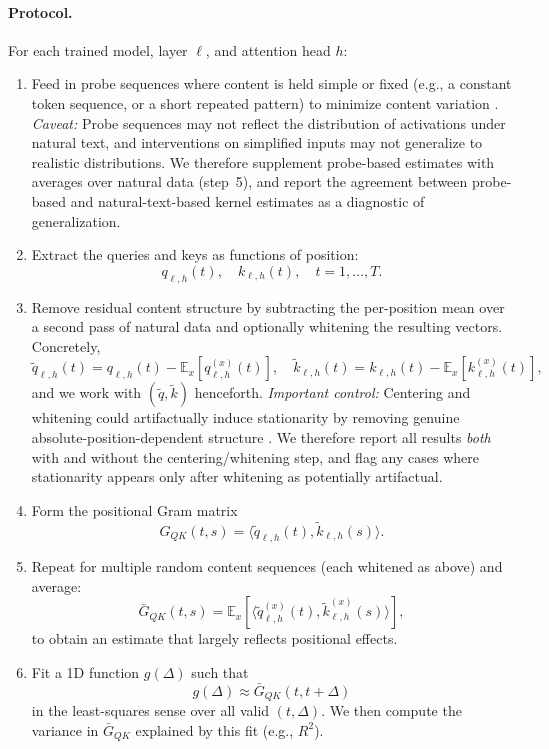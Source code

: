 \documentclass[11pt]{article}
\theoremstyle{definition}
\begin{document}
\paragraph{Protocol.}
For each trained model, layer \(\ell\), and attention head \(h\):

\begin{enumerate}
    \item Feed in probe sequences where content is held simple or fixed (e.g., a constant token sequence, or a short repeated pattern) to minimize content variation \cite{belinkov2022probing,geiger2021causal}. \emph{Caveat:} Probe sequences may not reflect the distribution of activations under natural text, and interventions on simplified inputs may not generalize to realistic distributions. We therefore supplement probe-based estimates with averages over natural data (step~5), and report the agreement between probe-based and natural-text-based kernel estimates as a diagnostic of generalization.
    \item Extract the queries and keys as functions of position:
    \[
      q_{\ell,h}(t), \quad k_{\ell,h}(t), \quad t = 1,\dots,T.
    \]
    \item Remove residual content structure by subtracting the per-position mean over a second pass of natural data and optionally whitening the resulting vectors. Concretely,
    \[
      \tilde{q}_{\ell,h}(t) = q_{\ell,h}(t) - \mathbb{E}_x[q_{\ell,h}^{(x)}(t)], \quad
      \tilde{k}_{\ell,h}(t) = k_{\ell,h}(t) - \mathbb{E}_x[k_{\ell,h}^{(x)}(t)],
    \]
    and we work with \((\tilde{q}, \tilde{k})\) henceforth. \emph{Important control:} Centering and whitening could artifactually induce stationarity by removing genuine absolute-position-dependent structure \cite{kornblith2019similarity}. We therefore report all results \emph{both} with and without the centering/whitening step, and flag any cases where stationarity appears only after whitening as potentially artifactual.
    \item Form the positional Gram matrix
    \[
      G_{QK}(t,s) = \langle \tilde{q}_{\ell,h}(t), \tilde{k}_{\ell,h}(s) \rangle.
    \]
    \item Repeat for multiple random content sequences (each whitened as above) and average:
    \[
      \bar{G}_{QK}(t,s) = \mathbb{E}_x \left[ \langle \tilde{q}_{\ell,h}^{(x)}(t), \tilde{k}_{\ell,h}^{(x)}(s) \rangle \right],
    \]
    to obtain an estimate that largely reflects positional effects.
    \item Fit a 1D function \(g(\Delta)\) such that
    \[
      g(\Delta) \approx \bar{G}_{QK}(t, t + \Delta)
    \]
    in the least-squares sense over all valid \((t, \Delta)\). We then compute the variance in \(\bar{G}_{QK}\) explained by this fit (e.g., \(R^2\)).
\end{enumerate}
\end{document}
